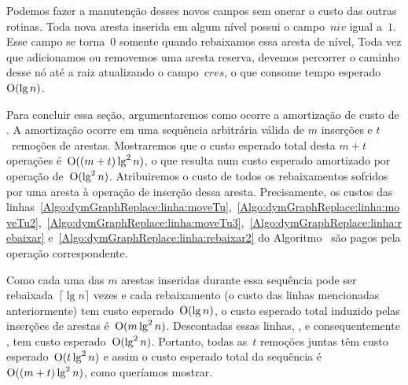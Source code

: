 Podemos fazer a manutenção desses novos campos sem onerar o custo das outras rotinas.
Toda nova aresta inserida em algum nível possui o campo~$niv$ igual a~$1$.
Esse campo se torna~$0$ somente quando rebaixamos essa aresta de nível,
Toda vez que adicionamos ou removemos uma aresta reserva, devemos percorrer o caminho desse nó até a raiz atualizando o campo~$cres$, o que consome tempo esperado~$\mathrm{O}(\lg n)$.

Para concluir essa seção, argumentaremos como ocorre a amortização de custo de \dymGraphDelEdge{}. 
A amortização ocorre em uma sequência arbitrária válida de $m$ inserções e $t$~remoções de arestas.
Mostraremos que o custo esperado total desta $m+t$ operações é~$\mathrm{O}((m+t)\lg^2 n)$,
o que resulta num custo esperado amortizado por operação de~$\mathrm{O}(\lg^2 n)$.
Atribuiremos o custo de todos os rebaixamentos sofridos por uma aresta à operação de inserção dessa aresta.
Precisamente, os custos das linhas~\ref{Algo:dymGraphReplace:linha:moveTu},~\ref{Algo:dymGraphReplace:linha:moveTu2},~\ref{Algo:dymGraphReplace:linha:moveTu3},~\ref{Algo:dymGraphReplace:linha:rebaixar} e~\ref{Algo:dymGraphReplace:linha:rebaixar2} do Algoritmo~\dymGraphReplace{} são pagos pela operação \dymGraphAddEdge{} correspondente.

Como cada uma das $m$ arestas inseridas durante essa sequência pode ser rebaixada~$\lceil \lg n \rceil$ vezes e cada rebaixamento (o custo das linhas mencionadas anteriormente) tem custo esperado~$\mathrm{O}(\lg n)$, o custo esperado total induzido pelas inserções de arestas é~$\mathrm{O}(m\lg^2 n)$.
Descontadas essas linhas, \dymGraphReplace{}, e consequentemente \dymGraphDelEdge{}, tem custo esperado~$\mathrm{O}(\lg^2 n)$.
Portanto, todas as~$t$ remoções juntas têm custo esperado~$\mathrm{O}(t\lg^2 n)$ e assim o custo esperado total da sequência é~$\mathrm{O}((m+t)\lg^2 n)$, como queríamos mostrar.

